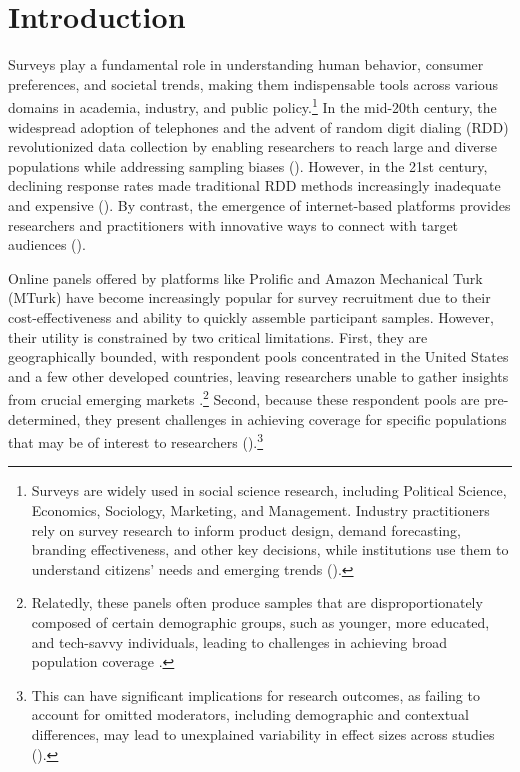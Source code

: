\documentclass[letterpaper,12pt]{article}
\theoremstyle{proposition}
\begin{document}
\section*{Introduction}
Surveys play a fundamental role in understanding human behavior, consumer preferences, and societal trends, making them indispensable tools across various domains in academia, industry, and public policy.\footnote{Surveys are widely used in social science research, including Political Science, Economics, Sociology, Marketing, and Management. Industry practitioners rely on survey research to inform product design, demand forecasting, branding effectiveness, and other key decisions, while institutions use them to understand citizens' needs and emerging trends (\citealt{rossi2013handbook, vannette2017palgrave}).} In the mid-20th century, the widespread adoption of telephones and the advent of random digit dialing (RDD) revolutionized data collection by enabling researchers to reach large and diverse populations while addressing sampling biases (\citealt{Cooper1964,Glasser1972,sudman1973uses}). However, in the 21st century, declining response rates made traditional RDD methods increasingly inadequate and expensive (\citealt{keeter2017low}). By contrast, the emergence of internet-based platforms provides researchers and practitioners with innovative ways to connect with target audiences (\citealt{yeager2011comparing}). 


Online panels offered by platforms like Prolific and Amazon Mechanical Turk (MTurk) have become increasingly popular for survey recruitment due to their cost-effectiveness and ability to quickly assemble participant samples. However, their utility is constrained by two critical limitations. First, they are geographically bounded, with respondent pools concentrated in the United States and a few other developed countries, leaving researchers unable to gather insights from crucial emerging markets \citep{narasimhan2015marketing}.\footnote{Relatedly, these panels often produce samples that are disproportionately composed of certain demographic groups, such as younger, more educated, and tech-savvy individuals, leading to challenges in achieving broad population coverage \citep{stewart2015average}.} Second, because these respondent pools are pre-determined, they present challenges in achieving coverage for specific populations that may be of interest to researchers (\citealt{peer2017beyond}).\footnote{This can have significant implications for research outcomes, as failing to account for omitted moderators, including demographic and contextual differences, may lead to unexplained variability in effect sizes across studies (\citealt{krefeld2024exposing}).}
\end{document}
